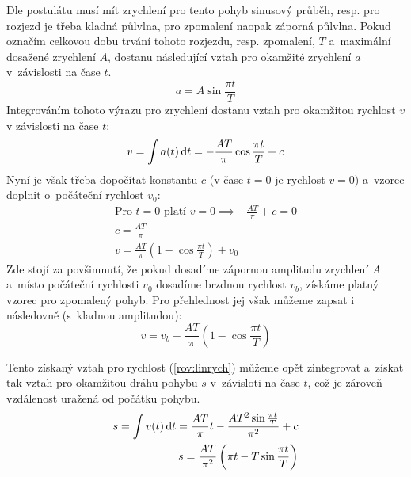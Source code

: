 		Dle postulátu musí mít zrychlení pro tento pohyb sinusový průběh, resp. pro rozjezd je třeba kladná půlvlna, pro zpomalení naopak záporná půlvlna. Pokud označím celkovou dobu trvání tohoto rozjezdu, resp. zpomalení, $T$ a~maximální dosažené zrychlení $A$, dostanu následující vztah pro okamžité zrychlení $a$ v~závislosti na čase $t$.
		\begin{equation}
			a=A \sin\frac{\pi t}{T}\label{rov:1}
		\end{equation}
		Integrováním tohoto výrazu pro zrychlení dostanu vztah pro okamžitou rychlost $v$ v závislosti na čase $t$:
		\begin{equation}
			v=\int a(t) \dif t = -\frac{AT}{\pi}\cos  \frac{\pi t}{T} + c
		\end{equation}
		Nyní je však třeba dopočítat konstantu $c$ (v čase $t=0$ je rychlost $v=0$) a~vzorec doplnit o~počáteční rychlost $v_0$:
		\begin{eqnarray}
			\text{Pro } t = 0 \text{ platí } v = 0 \implies -\frac{AT}{\pi} + c = 0  \nonumber \\
			c = \frac{AT}{\pi} \nonumber \\
			v = \frac{AT}{\pi} \left(1 - \cos \frac{\pi t}{T} \right) + v_0	 \label{rov:linrych}
		\end{eqnarray}
		Zde stojí za povšimnutí, že pokud dosadíme zápornou amplitudu zrychlení $A$ a~místo počáteční rychlosti $v_0$ dosadíme brzdnou rychlost $v_b$, získáme platný vzorec pro zpomalený pohyb. Pro přehlednost jej však můžeme zapsat i následovně (s~kladnou amplitudou):
		\begin{equation}
			v = v_b - \frac{AT}{\pi} \left(1 - \cos \frac{\pi t}{T} \right)
		\end{equation}
		
		Tento získaný vztah pro rychlost (\ref{rov:linrych}) můžeme opět zintegrovat a~získat tak vztah pro okamžitou dráhu pohybu $s$ v~závisloti na čase $t$, což je zároveň vzdálenost uražená od počátku pohybu.
		\begin{eqnarray}
			s=\int v(t) \dif t = \frac{AT}{\pi}t - \frac{AT^2\sin \frac{\pi t}{T}}{\pi^2} + c \nonumber \\
			s = \frac{AT}{\pi^2}\left( \pi t - T \sin \frac{\pi t}{T}\right) \label{rov:lindraha}
		\end{eqnarray}
		
